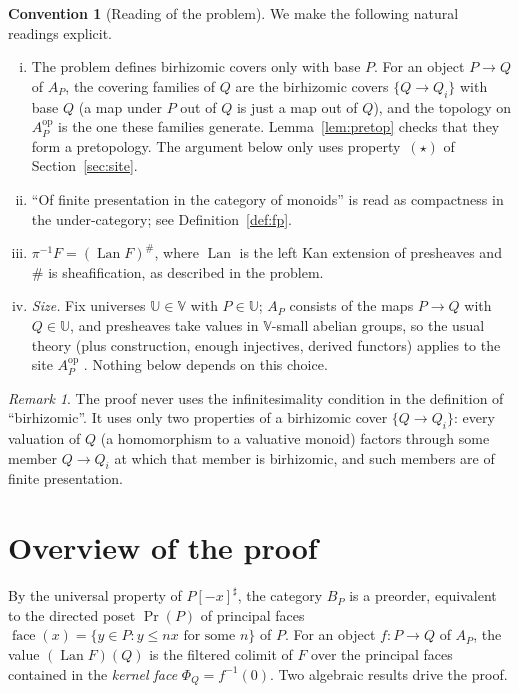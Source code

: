\documentclass[11pt]{article}
\theoremstyle{definition}
\newtheorem{convention}[theorem]{Convention}
\theoremstyle{remark}
\newtheorem{remark}[theorem]{Remark}
\newcommand{\face}{\operatorname{face}}
\newcommand{\Prin}{\operatorname{Pr}}
\newcommand{\Lan}{\operatorname{Lan}}
\begin{document}
\begin{convention}[Reading of the problem]\label{conv}
We make the following natural readings explicit.
\begin{enumerate}[(i)]
\item The problem defines birhizomic covers only with base $P$. For an object $P\to Q$ of $A_P$, the covering families of $Q$ are the birhizomic covers $\{Q\to Q_i\}$ with base $Q$ (a map under $P$ out of $Q$ is just a map out of $Q$), and the topology on $A_P^{\mathrm{op}}$ is the one these families generate. Lemma~\ref{lem:pretop} checks that they form a pretopology. The argument below only uses property~$(\star)$ of Section~\ref{sec:site}.
\item ``Of finite presentation in the category of monoids'' is read as compactness in the under-category; see Definition~\ref{def:fp}.
\item $\pi^{-1}F=(\Lan F)^\#$, where $\Lan$ is the left Kan extension of presheaves and $\#$ is sheafification, as described in the problem.
\item \emph{Size.} Fix universes $\mathbb U\in\mathbb V$ with $P\in\mathbb U$; $A_P$ consists of the maps $P\to Q$ with $Q\in\mathbb U$, and presheaves take values in $\mathbb V$-small abelian groups, so the usual theory (plus construction, enough injectives, derived functors) applies to the site $A_P^{\mathrm{op}}$ \cite[Exp.~I]{SGA4}. Nothing below depends on this choice.
\end{enumerate}
\end{convention}

\begin{remark}
The proof never uses the infinitesimality condition in the definition of ``birhizomic''. It uses only two properties of a birhizomic cover $\{Q\to Q_i\}$: every valuation of $Q$ (a homomorphism to a valuative monoid) factors through some member $Q\to Q_i$ at which that member is birhizomic, and such members are of finite presentation.
\end{remark}

\section{Overview of the proof}

By the universal property of $P[-x]^\sharp$, the category $B_P$ is a preorder, equivalent to the directed poset $\Prin(P)$ of principal faces $\face(x)=\{y\in P: y\le nx \text{ for some } n\}$ of $P$. For an object $f\colon P\to Q$ of $A_P$, the value $(\Lan F)(Q)$ is the filtered colimit of $F$ over the principal faces contained in the \emph{kernel face} $\Phi_Q=f^{-1}(0)$. Two algebraic results drive the proof.
\end{document}
